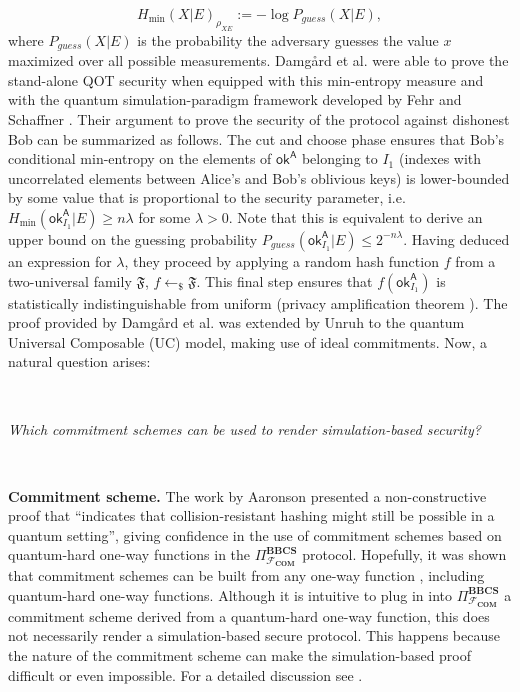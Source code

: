 $$H_{\text{min}}(X | E)_{\rho_{X E}} := -\log P_{guess}(X|E),$$
where $P_{guess}(X|E)$ is the probability the adversary guesses the value $x$ maximized over all possible measurements. Damg{\aa}rd et al. \cite{DFLSS09} were able to prove the stand-alone QOT security when equipped with this min-entropy measure and with the quantum simulation-paradigm framework developed by Fehr and Schaffner \cite{FS09}. Their argument to prove the security of the protocol against dishonest Bob can be summarized as follows. The cut and choose phase ensures that Bob's conditional min-entropy on the elements of $\mathsf{ok}^{\mathsf{A}}$ belonging to $I_{1}$ (indexes with uncorrelated elements between Alice's and Bob's oblivious keys) is lower-bounded by some value that is proportional to the security parameter, i.e. $H_{\text{min}}(\mathsf{ok}^{\mathsf{A}}_{I_{1}} | E) \geq n\lambda$ for some $\lambda > 0$. Note that this is equivalent to derive an upper bound on the guessing probability $P_{guess}(\mathsf{ok}^{\mathsf{A}}_{I_{1}}|E) \leq 2^{-n\lambda}$. Having deduced an expression for $\lambda$, they proceed by applying a random hash function $f$ from a two-universal family $\mathfrak{F}$, $f\leftarrow_{\$}\mathfrak{F}$. This final step ensures that $f(\mathsf{ok}^{\mathsf{A}}_{I_{1}})$ is statistically indistinguishable from uniform (privacy amplification theorem \cite{DFRSS07, RK05, R05}). The proof provided by Damg{\aa}rd et al. \cite{DFLSS09} was extended by Unruh \cite{U10} to the quantum Universal Composable (UC) model, making use of ideal commitments. Now, a natural question arises: 

\

\centerline{\textit{Which commitment schemes can be used to render simulation-based security?}}

\

\noindent\textbf{Commitment scheme.} The work by Aaronson \cite{A02} presented a non-constructive proof that ``indicates that collision-resistant hashing might still be possible in a quantum setting'', giving confidence in the use of commitment schemes based on quantum-hard one-way functions in the $\Pi^{\textbf{BBCS}}_{\mathcal{F}_{\textbf{COM}}}$ protocol. Hopefully, it was shown that commitment schemes can be built from any one-way function \cite{N91, HILL99, HR07}, including quantum-hard one-way functions. Although it is intuitive to plug in into $\Pi^{\textbf{BBCS}}_{\mathcal{F}_{\textbf{COM}}}$ a commitment scheme derived from a quantum-hard one-way function, this does not necessarily render a simulation-based secure protocol. This happens because the nature of the commitment scheme can make the simulation-based proof difficult or even impossible. For a detailed discussion see \cite{GLSV21}.

